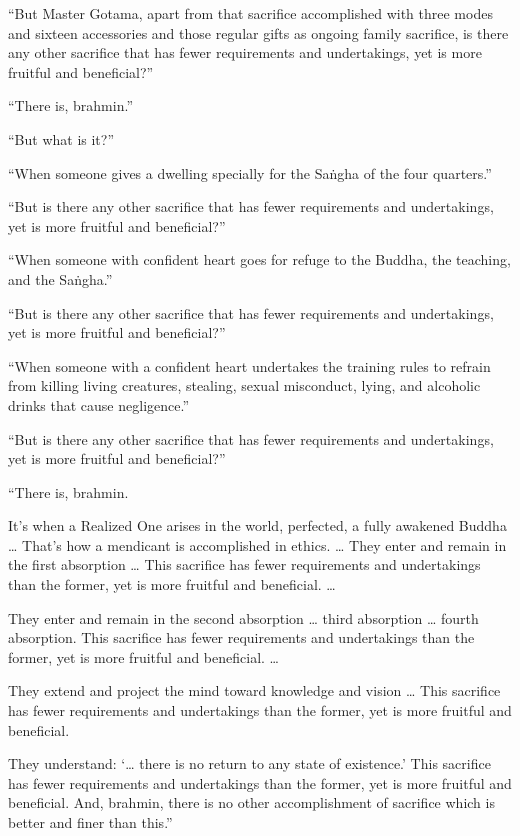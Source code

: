 \documentclass[12pt,openany]{book}%
\begin{document}
“But Master Gotama, apart from that sacrifice accomplished with three modes and sixteen accessories and those regular gifts as ongoing family sacrifice, is there any other sacrifice that has fewer requirements and undertakings, yet is more fruitful and beneficial?” 

“There is, brahmin.” 

“But what is it?” 

“When someone gives a dwelling specially for the \textsanskrit{Saṅgha} of the four quarters.” 

“But is there any other sacrifice that has fewer requirements and undertakings, yet is more fruitful and beneficial?” 

“When someone with confident heart goes for refuge to the Buddha, the teaching, and the \textsanskrit{Saṅgha}.” 

“But is there any other sacrifice that has fewer requirements and undertakings, yet is more fruitful and beneficial?” 

“When someone with a confident heart undertakes the training rules to refrain from killing living creatures, stealing, sexual misconduct, lying, and alcoholic drinks that cause negligence.” 

“But is there any other sacrifice that has fewer requirements and undertakings, yet is more fruitful and beneficial?” 

“There is, brahmin. 

It’s when a Realized One arises in the world, perfected, a fully awakened Buddha … That’s how a mendicant is accomplished in ethics. … They enter and remain in the first absorption … This sacrifice has fewer requirements and undertakings than the former, yet is more fruitful and beneficial. … 

They enter and remain in the second absorption … third absorption … fourth absorption. This sacrifice has fewer requirements and undertakings than the former, yet is more fruitful and beneficial. … 

They extend and project the mind toward knowledge and vision … This sacrifice has fewer requirements and undertakings than the former, yet is more fruitful and beneficial. 

They understand: ‘… there is no return to any state of existence.’ This sacrifice has fewer requirements and undertakings than the former, yet is more fruitful and beneficial. And, brahmin, there is no other accomplishment of sacrifice which is better and finer than this.” 
\end{document}
